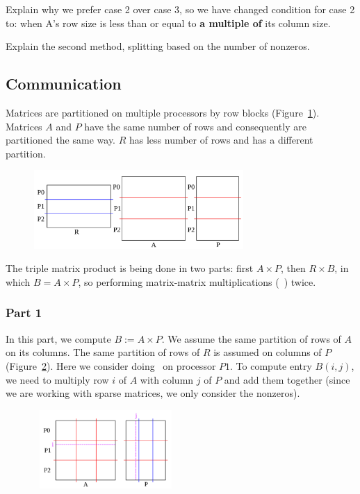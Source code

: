 Explain why we prefer case 2 over case 3, so we have changed condition for case 2 to: when A's row size is less than or equal to \textbf{a multiple of} its column size.

Explain the second method, splitting based on the number of nonzeros.


\subsection{Communication}
\label{sec:comm}

Matrices are partitioned on multiple processors by row blocks (Figure~\ref{fig:partition}). Matrices $A$ and $P$ have the same number of rows and consequently are partitioned the same way. $R$ has less number of rows and has a different partition.

\begin{figure}[tbh]
 \centering
 \includegraphics[width=8cm,height=3cm]{./figures/partition.pdf}
 \caption{}
 \label{fig:partition}
\end{figure}

The triple matrix product is being done in two parts: first $A \times P$, then $R \times B$, in which $B = A \times P$, so performing matrix-matrix multiplications (\mm~) twice.

\subsubsection{Part 1}

In this part, we compute $B := A \times P$. We assume the same partition of rows of $A$ on its columns. The same partition of rows of $R$ is assumed on columns of $P$ (Figure~\ref{fig:part1b}).
Here we consider doing \mm ~on processor $P1$. To compute entry $B(i, j)$, we need to multiply row $i$ of $A$ with column $j$ of $P$ and add them together (since we are working with sparse matrices, we only consider the nonzeros).

\begin{figure}[tbh]
 \centering
 \includegraphics[width=5.5cm,height=3cm]{./figures/part1b.pdf}
 \caption{}
 \label{fig:part1b}
\end{figure}

